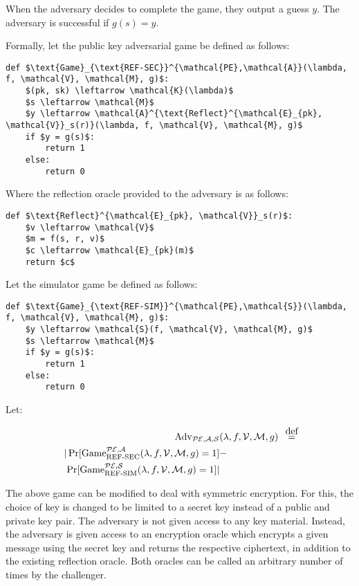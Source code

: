 \documentclass{sig-alternate-05-2015}
\newcommand\defeq{\stackrel{\mathclap{\normalfont\mbox{def}}}{=}}
\begin{document}
When the adversary decides to complete the game, they output a guess $y$. The
adversary is successful if $g(s) = y$.

Formally, let the public key adversarial game be defined as follows:

\begin{lstlisting}[texcl,mathescape]
def $\text{Game}_{\text{REF-SEC}}^{\mathcal{PE},\mathcal{A}}(\lambda, f, \mathcal{V}, \mathcal{M}, g)$:
    $(pk, sk) \leftarrow \mathcal{K}(\lambda)$
    $s \leftarrow \mathcal{M}$
    $y \leftarrow \mathcal{A}^{\text{Reflect}^{\mathcal{E}_{pk}, \mathcal{V}}_s(r)}(\lambda, f, \mathcal{V}, \mathcal{M}, g)$
    if $y = g(s)$:
        return 1
    else:
        return 0
\end{lstlisting}

Where the reflection oracle provided to the adversary is as follows:

\begin{lstlisting}[texcl,mathescape]
def $\text{Reflect}^{\mathcal{E}_{pk}, \mathcal{V}}_s(r)$:
    $v \leftarrow \mathcal{V}$
    $m = f(s, r, v)$
    $c \leftarrow \mathcal{E}_{pk}(m)$
    return $c$
\end{lstlisting}

Let the simulator game be defined as follows:

\begin{lstlisting}[texcl,mathescape]
def $\text{Game}_{\text{REF-SIM}}^{\mathcal{PE},\mathcal{S}}(\lambda, f, \mathcal{V}, \mathcal{M}, g)$:
    $y \leftarrow \mathcal{S}(f, \mathcal{V}, \mathcal{M}, g)$
    $s \leftarrow \mathcal{M}$
    if $y = g(s)$:
        return 1
    else:
        return 0
\end{lstlisting}

Let:

\begin{align*}
    \text{Adv}_{\mathcal{PE}, \mathcal{A}, \mathcal{S}}&(\lambda, f, \mathcal{V}, \mathcal{M}, g) &\defeq\\
    |\Pr[\text{Game}_{\text{REF-SEC}}^{\mathcal{PE},\mathcal{A}}(\lambda, f, \mathcal{V}, \mathcal{M}, g) = 1] &-\\
    \Pr[\text{Game}_{\text{REF-SIM}}^{\mathcal{PE},\mathcal{S}}(\lambda, f, \mathcal{V}, \mathcal{M}, g) = 1]| &
\end{align*}

The above game can be modified to deal with symmetric encryption. For this, the
choice of key is changed to be limited to a secret key instead of a public and
private key pair. The adversary is not given access to any key material.
Instead, the adversary is given access to an encryption oracle which encrypts a
given message using the secret key and returns the respective ciphertext, in
addition to the existing reflection oracle. Both oracles can be called an
arbitrary number of times by the challenger.
\end{document}
